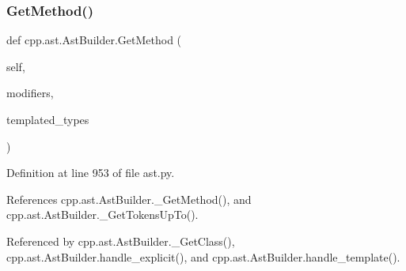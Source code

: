\subsubsection{\texorpdfstring{Get\+Method()}{GetMethod()}}
{\footnotesize\ttfamily def cpp.\+ast.\+Ast\+Builder.\+Get\+Method (\begin{DoxyParamCaption}\item[{}]{self,  }\item[{}]{modifiers,  }\item[{}]{templated\+\_\+types }\end{DoxyParamCaption})}



Definition at line 953 of file ast.\+py.



References cpp.\+ast.\+Ast\+Builder.\+\_\+\+Get\+Method(), and cpp.\+ast.\+Ast\+Builder.\+\_\+\+Get\+Tokens\+Up\+To().



Referenced by cpp.\+ast.\+Ast\+Builder.\+\_\+\+Get\+Class(), cpp.\+ast.\+Ast\+Builder.\+handle\+\_\+explicit(), and cpp.\+ast.\+Ast\+Builder.\+handle\+\_\+template().


